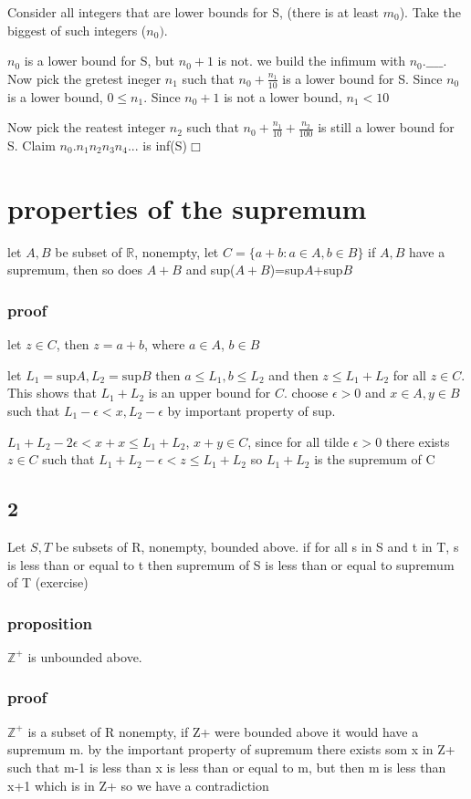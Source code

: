 \documentclass[letterpaper]{article}
\begin{document}
Consider all integers that are lower bounds for S, (there is at least $m_0$). Take the biggest of such integers ($n_0)$.

$n_0$ is a lower bound for S, but $n_0+1$ is not. we build the infimum with $n_0.\_\_\_\_$. Now pick the gretest ineger $n_1$ such that $n_0+\frac{n_1}{10}$ is a lower bound for S. Since $n_0$ is a lower bound, $0\le n_1$.  Since $n_0+1$ is not a lower bound, $n_1<10$

Now pick the reatest integer $n_2$ such that $n_0+\frac{n_1}{10}+\frac{n_2}{100}$ is still a lower bound for S. Claim $n_0.n_1n_2n_3n_4...$ is inf(S)$\Box$

\section*{properties of the supremum}
let $A,B$ be subset of $\mathbb{R}$, nonempty, let $C=\{a+b:a\in A, b\in B\}$ if $A,B$ have a supremum, then so does $A+B$ and sup($A+B$)=sup$A$+sup$B$
\subsubsection*{proof}
let $z\in C$, then $z=a+b$, where $a\in A$, $b\in B$

let $L_1=\text{sup}A, L_2=\text{sup}B$ then $a\le L_1, b\le L_2$ and then $z\le L_1+L_2$ for all $z\in C$. This shows that $L_1+L_2$ is an upper bound for $C$. choose $\epsilon>0$ and $x\in A, y\in B$ such that $L_1-\epsilon<x, L_2-\epsilon$  by important property  of sup.

$L_1+L_2-2\epsilon<x+x\le L_1+L_2$, $x+y\in C$, since for all tilde $\epsilon>0$ there exists $z\in C$ such that $L_1+L_2-\epsilon<z\le L_1+L_2$ so $L_1+L_2$ is the supremum of C
\subsection*{2}
Let $S,T$ be subsets of R, nonempty, bounded above. if for all s in S and t in T, s is less than or equal to t then supremum of S is less than or equal to supremum of T (exercise)

\subsubsection*{proposition}
$\mathbb{Z}^+$ is unbounded above.
\subsubsection*{proof}
$\mathbb{Z}^+$ is a subset of R nonempty, if Z+ were bounded above it would have a supremum m. by the important property of supremum there exists som x in Z+ such that m-1 is less than x is less than or equal to m, but then m is less than x+1 which  is in Z+ so we have a contradiction
\end{document}
